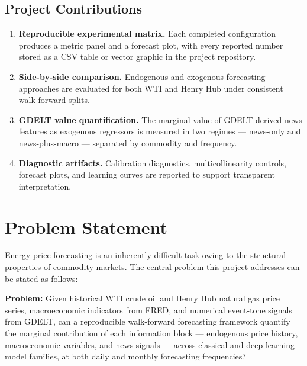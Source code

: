 \documentclass[12pt,a4paper]{article}
\begin{document}
\subsection*{Project Contributions}

\begin{enumerate}[leftmargin=*,label=\textbf{\arabic*.}]
  \item \textbf{Reproducible experimental matrix.} Each completed configuration produces a metric panel and a forecast plot, with every reported number stored as a CSV table or vector graphic in the project repository.
  \item \textbf{Side-by-side comparison.} Endogenous and exogenous forecasting approaches are evaluated for both WTI and Henry Hub under consistent walk-forward splits.
  \item \textbf{GDELT value quantification.} The marginal value of GDELT-derived news features as exogenous regressors is measured in two regimes — news-only and news-plus-macro — separated by commodity and frequency.
  \item \textbf{Diagnostic artifacts.} Calibration diagnostics, multicollinearity controls, forecast plots, and learning curves are reported to support transparent interpretation.
\end{enumerate}

\section{Problem Statement}\label{sec:problem}

Energy price forecasting is an inherently difficult task owing to the structural properties of commodity markets. The central problem this project addresses can be stated as follows:

\begin{mdframed}[backgroundcolor=lightgray,linecolor=gwublue,linewidth=1pt]
\textbf{Problem:} Given historical WTI crude oil and Henry Hub natural gas price series, macroeconomic indicators from FRED, and numerical event-tone signals from GDELT, can a reproducible walk-forward forecasting framework quantify the marginal contribution of each information block — endogenous price history, macroeconomic variables, and news signals — across classical and deep-learning model families, at both daily and monthly forecasting frequencies?
\end{mdframed}
\end{document}
